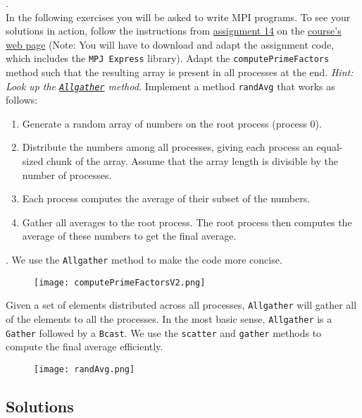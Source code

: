 \documentclass[main]{subfiles}
\begin{document}
\begin{ExerciseList}
    
    \Exercise[title={Message Passing},label=MPI]. \quad \\
        In the following exercises you will be asked to write MPI programs. To see your solutions in action, follow the instructions from \href{https://spcl.inf.ethz.ch/Teaching/2020-pp/exercises/assignment14.pdf}{assignment 14} on the \href{https://spcl.inf.ethz.ch/Teaching/2020-pp/}{course's web page} (Note: You will have to download and adapt the assignment code, which includes the \texttt{MPJ Express} library). 
        \Question Adapt the \texttt{computePrimeFactors} method such that the resulting array is present in all processes at the end. \textit{Hint: Look up the \href{https://www.open-mpi.org/doc/v3.0/man3/MPI_Allgather.3.php}{\texttt{Allgather}} method.}
        \Question Implement a method \texttt{randAvg} that works as follows:
            \begin{enumerate}
                \item Generate a random array of numbers on the root process (process 0).
                \item Distribute the numbers among all processes, giving each process an equal-sized chunk of the array. Assume that the array length is divisible by the number of processes.
                \item Each process computes the average of their subset of the numbers.
                \item Gather all averages to the root process. The root process then computes the average of these numbers to get the final average.
            \end{enumerate}
    
    \Answer[ref={MPI}]. \quad
        \Question We use the \texttt{Allgather} method to make the code more concise.
            \begin{figure}[H]
                \centering
                \texttt{[image: computePrimeFactorsV2.png]}
            \end{figure}
            Given a set of elements distributed across all processes, \texttt{Allgather} will gather all of the elements to all the processes. In the most basic sense, \texttt{Allgather} is a \texttt{Gather} followed by a \texttt{Bcast}.
        \pagebreak
        \Question We use the \texttt{scatter} and \texttt{gather} methods to compute the final average efficiently.
        \begin{figure}[H]
            \centering
            \texttt{[image: randAvg.png]}
        \end{figure}
\end{ExerciseList}
\newpage
\subsection{Solutions}
\shipoutAnswer
\end{document}

